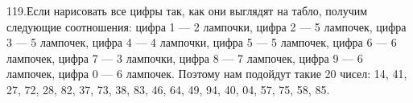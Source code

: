 119.Если нарисовать все цифры так, как они выглядят на табло, получим следующие соотношения: цифра 1 --- 2 лампочки, цифра 2 --- 5 лампочек, цифра 3 --- 5 лампочек, цифра 4 --- 4 лампочки, цифра 5 --- 5 лампочек, цифра 6 --- 6 лампочек, цифра 7 --- 3 лампочки, цифра 8 --- 7 лампочек, цифра 9 --- 6 лампочек, цифра 0 --- 6 лампочек. Поэтому нам подойдут такие 20 чисел: 14, 41, 27, 72, 28, 82, 37, 73, 38, 83, 46, 64, 49, 94, 40, 04, 57, 75, 58, 85.\\
